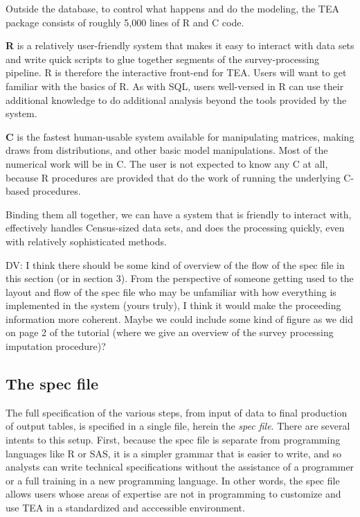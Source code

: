 \documentclass{article}
\begin{document}
Outside the database, to control what happens and
do the modeling, the TEA package consists of roughly 5,000 lines of R and C code.
\comment{

}

{\bf R} is a relatively user-friendly system that makes it easy to interact with data
sets and write quick scripts to glue together segments of the survey-processing pipeline.
R is therefore the interactive front-end for TEA. Users will want to get familiar with the basics of
R.  As with SQL, users well-versed in R can use their additional knowledge to do additional
analysis beyond the tools provided by the system.

{\bf C} is the fastest human-usable system available for manipulating matrices, making
draws from distributions, and other basic model manipulations. Most of the numerical
work will be in C. The user is not expected to know any C at all, because R procedures
are provided that do the work of running the underlying C-based procedures.

Binding them all together, we can have a system that is friendly to interact with, effectively handles Census-sized data sets, and does the processing quickly, even with relatively sophisticated methods.


\comment
{	
	DV: I think there should be some kind of overview of the flow of the spec file 
	in this section (or in section 3). From the perspective of someone getting used to the 
	layout and flow of the spec file who may be unfamiliar with how everything 
	is implemented in the system (yours truly), I think it would make the proceeding 
	information more coherent. Maybe we could include some kind of figure as we did on 
	page 2 of the tutorial (where we give an overview of the survey processing imputation 
	procedure)?
}

\subsection{The spec file} \label{specsec}
The full specification of the various steps, from input of data to final production of
output tables, is specified in a single file, herein the {\em spec file}. There are
several intents to this setup. First, because the spec file is separate from programming
languages like R or SAS, it is a simpler grammar that is easier to write, and so 
analysts can write technical specifications without the assistance of a programmer or
a full training in a new programming language. In other words, the spec file allows 
users whose areas of expertise are not in programming to customize and use TEA in a 
standardized and acccessible environment. 
\end{document}
